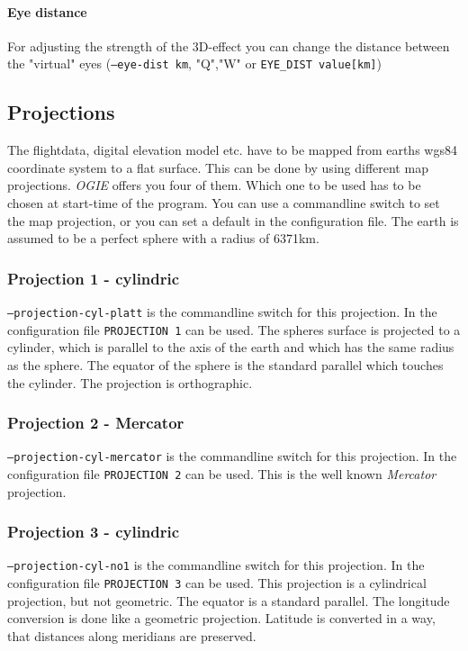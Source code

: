 \paragraph{Eye distance}
For adjusting the strength of the 3D-effect you can change the distance between
the "virtual" eyes (\texttt{--eye-dist km}, "Q","W" or \texttt{EYE\_DIST value[km]})


\subsection{Projections}
\label{projections}

The flightdata, digital elevation model etc. have to be mapped from earths wgs84 coordinate system to a flat surface. This can be done by using different map projections. \emph{OGIE} offers you four of them.  Which one to be used has to be chosen at start-time of the program. You can use a commandline switch to set the map projection, or you can set a default in the configuration file.
The earth is assumed to be a perfect sphere with a radius of 6371km.

\subsubsection{Projection 1 - cylindric}
\texttt{--projection-cyl-platt} is the commandline switch for this projection. In the configuration file \texttt{PROJECTION 1} can be used. The spheres surface is projected to a cylinder, which is parallel to the axis of the earth and which has the same radius as the sphere. The equator of the sphere is the standard parallel which touches the cylinder. The projection is orthographic.

\subsubsection{Projection 2 - Mercator}
\texttt{--projection-cyl-mercator} is the commandline switch for this projection. In the configuration file \texttt{PROJECTION 2} can be used. This is the well known \emph{Mercator} projection.

\subsubsection{Projection 3 - cylindric}
\texttt{--projection-cyl-no1} is the commandline switch for this projection. In the configuration file \texttt{PROJECTION 3} can be used. This projection is a cylindrical projection, but not geometric. The equator is a standard parallel. The longitude conversion is done like a geometric projection. Latitude is converted in a way, that distances along meridians are preserved.

